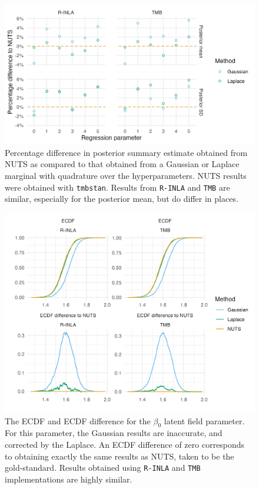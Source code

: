 \documentclass[a4paper, nobind]{templates/ociamthesis}
\begin{document}
\begin{figure}
\includegraphics[width=0.95\linewidth]{figures/naomi-aghq/beta-mean-sd} \caption{Percentage difference in posterior summary estimate obtained from NUTS as compared to that obtained from a Gaussian or Laplace marginal with quadrature over the hyperparameters. NUTS results were obtained with \texttt{tmbstan}. Results from \texttt{R-INLA} and \texttt{TMB} are similar, especially for the posterior mean, but do differ in places.}\label{fig:beta-mean-sd}
\end{figure}



\begin{figure}
\includegraphics[width=0.95\linewidth]{figures/naomi-aghq/intercept-comparison} \caption{The ECDF and ECDF difference for the \(\beta_0\) latent field parameter. For this parameter, the Gaussian results are inaccurate, and corrected by the Laplace. An ECDF difference of zero corresponds to obtaining exactly the same results as NUTS, taken to be the gold-standard. Results obtained using \texttt{R-INLA} and \texttt{TMB} implementations are highly similar.}\label{fig:intercept-comparison}
\end{figure}
\end{document}
